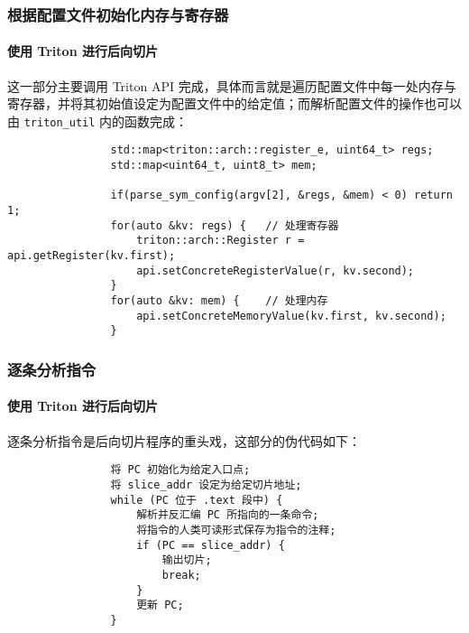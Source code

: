 \documentclass{ctexbeamer}
\begin{document}
    \begin{frame}[fragile]
        \frametitle{根据配置文件初始化内存与寄存器}
        \framesubtitle{使用 Triton 进行后向切片}
    
        这一部分主要调用 Triton API 完成，具体而言就是遍历配置文件中每一处内存与寄存器，并将其初始值设定为配置文件中的给定值；而解析配置文件的操作也可以由 \texttt{triton_util} 内的函数完成：

        {
            \small
            \begin{verbatim}
                std::map<triton::arch::register_e, uint64_t> regs;
                std::map<uint64_t, uint8_t> mem;

                if(parse_sym_config(argv[2], &regs, &mem) < 0) return 1;
                for(auto &kv: regs) {   // 处理寄存器
                    triton::arch::Register r = api.getRegister(kv.first);
                    api.setConcreteRegisterValue(r, kv.second);
                }
                for(auto &kv: mem) {    // 处理内存
                    api.setConcreteMemoryValue(kv.first, kv.second);
                }
            \end{verbatim}
        }
    
    \end{frame}

    \begin{frame}[fragile]
        \frametitle{逐条分析指令}
        \framesubtitle{使用 Triton 进行后向切片}
    
        逐条分析指令是后向切片程序的重头戏，这部分的伪代码如下：

        {
            \small
            \begin{verbatim}
                将 PC 初始化为给定入口点;
                将 slice_addr 设定为给定切片地址;
                while (PC 位于 .text 段中) {
                    解析并反汇编 PC 所指向的一条命令;
                    将指令的人类可读形式保存为指令的注释;
                    if (PC == slice_addr) {
                        输出切片;
                        break;
                    }
                    更新 PC;
                }
            \end{verbatim}
        }
    
    \end{frame}
\end{document}
